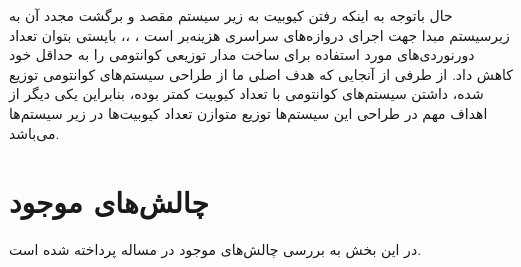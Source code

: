 حال باتوجه به اینکه رفتن کیوبیت به زیر سیستم مقصد و برگشت مجدد آن به زیرسیستم مبدا جهت اجرای دروازه‌های سراسری هزینه‌بر است \cite{sangouard2011quantum}، \cite{duan2001long}
،\cite{g2021efficient}، بایستی بتوان تعداد دورنوردی‌های مورد استفاده برای ساخت مدار توزیعی کوانتومی را به حداقل خود کاهش داد. از طرفی از آنجایی که هدف اصلی ما از طراحی سیستم‌های کوانتومی توزیع شده، داشتن سیستم‌های کوانتومی با تعداد کیوبیت کمتر بوده، بنابراین یکی دیگر از اهداف مهم در طراحی این سیستم‌ها توزیع متوازن تعداد کیوبیت‌ها در زیر سیستم‌ها می‌باشد. %

\section{چالش‌های موجود}
در این بخش به بررسی چالش‌های موجود در مساله پرداخته شده است.
